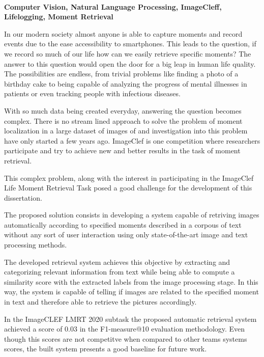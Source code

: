 \EndTitlePage
\titlepage\ \endtitlepage %

\TitlePage
  \vspace*{55mm}
       {\textbf{Computer Vision, Natural Language Processing, ImageCleff, Lifelogging, Moment Retrieval}}

     {In our modern society almost anyone is able to capture moments and record events due to the ease accessibility to smartphones. This leads to the question, if we record so much of our life how can we easily retrieve specific moments? The answer to this question would open the door for a big leap in human life quality. The possibilities are endless, from trivial problems like finding a photo of a birthday cake to being capable of analyzing the progress of mental illnesses in patients or even tracking people with infectious diseases.}

     \TEXT{}
     {With so much data being created everyday, answering the question becomes complex. There is no stream lined approach to solve the problem of moment localization in a large dataset of images of and investigation into this problem have only started a few years ago. ImageClef is one competition where researchers participate and try to achieve new and better results in the task of moment retrieval.}

     \TEXT{}
     {This complex problem, along with the interest in participating in the ImageClef Life Moment Retrieval Task posed a good challenge for the development of this dissertation.}

     \TEXT{}
     {The proposed solution consists in developing a system capable of retriving images automatically  according to specified moments described in a corpous of text without any sort of user interaction using only state-of-the-art image and text processing methods.}

     \TEXT{}
     {The developed retrieval system achieves this objective by extracting and categorizing relevant information from text while being able to compute a similarity score with the extracted labels from the image processing stage. In this way, the system is capable of telling if images are related to the specified moment in text and therefore able to retrieve the pictures accordingly.}

     \TEXT{}
     {In the ImageCLEF LMRT 2020 subtask the proposed automatic retrieval system achieved a score of 0.03 in the F1-measure@10 evaluation methodology. Even though this scores are not competitve when compared to other teams systems scores, the built system presents a good baseline for future work. }

\EndTitlePage
\titlepage\ \endtitlepage %
